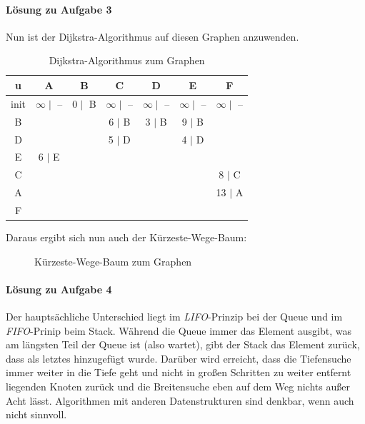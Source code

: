 \documentclass[11pt,a4paper]{scrartcl}
\begin{document}
\paragraph{Lösung zu Aufgabe 3}
\label{a6.3:lsg}
Nun ist der Dijkstra-Algorithmus auf diesen Graphen anzuwenden. 
\begin{table}[h]
\centering
\begin{tabular}{|c|c|c|c|c|c|c|}
\hline
u    & A 				& B 			& C 			& D 			& E 		& F \\
\hline
init & $\infty \mid$ -- 	& $0 \mid$ B &  $\infty \mid$ -- &  $\infty \mid$ --  &  $\infty \mid$ -- &  $\infty \mid$ --  \\
\hline
B 	&					&			& 6 $\mid$ B	& 3 $\mid$ B	& 9 $\mid$ B & \\
\hline
D	&					&			& 5 $\mid$ D&			& 4 $\mid$ D & \\
\hline
E   	& 6 $\mid$ E			&			&			&			&		&	\\
\hline
C 	&					&			&			&			&		& 8 $\mid$ C \\
\hline
A	& 					&			&			&			&		& 13 $\mid$ A\\
\hline
F 	&					&			&			&			&		& \\
\hline
\end{tabular}
\caption{Dijkstra-Algorithmus zum Graphen}
\end{table}
Daraus ergibt sich nun auch der Kürzeste-Wege-Baum:
\begin{figure}[h!]
\centering
{}
\caption{Kürzeste-Wege-Baum zum Graphen}
\end{figure}
\paragraph{Lösung zu Aufgabe 4}\label{a6.4:lsg}
Der hauptsächliche Unterschied liegt im \textit{LIFO}-Prinzip bei der Queue und im \textit{FIFO}-Prinip beim Stack. Während die Queue immer das Element ausgibt, was am längsten Teil der Queue ist (also wartet), gibt der Stack das Element zurück, dass als letztes hinzugefügt wurde. Darüber wird erreicht, dass die Tiefensuche immer weiter in die Tiefe geht und nicht in großen Schritten zu weiter entfernt liegenden Knoten zurück und die Breitensuche eben auf dem Weg nichts außer Acht lässt. Algorithmen mit anderen Datenstrukturen sind denkbar, wenn auch nicht sinnvoll.
\end{document}
